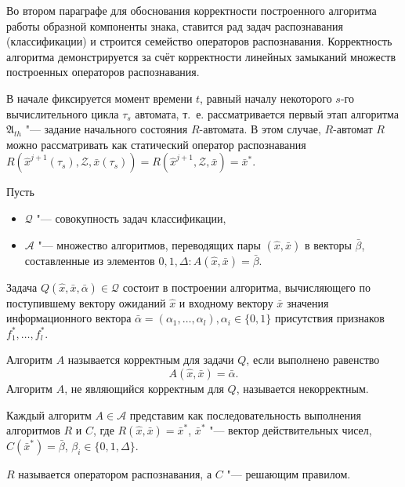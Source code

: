 Во втором параграфе для обоснования корректности построенного алгоритма работы образной компоненты знака, ставится рад задач распознавания (классификации) и строится семейство операторов распознавания. Корректность алгоритма демонстрируется за счёт корректности линейных замыканий множеств построенных операторов распознавания.

В начале фиксируется момент времени $t$, равный началу некоторого $s$-го вычислительного цикла $\tau_s$ автомата, т.~е. рассматривается первый этап алгоритма $\mathfrak A_{th}$ "--- задание начального состояния $R$-автомата.
В этом случае, $R$-автомат $R$ можно рассматривать как статический оператор распознавания $R(\hat x^{j+1}(\tau_s),\mathcal Z,\bar x(\tau_s))=R(\hat x^{j+1},\mathcal Z,\bar x)=\bar x^*$.

Пусть
\begin{itemize}
	\item $\mathcal Q$ "--- совокупность задач классификации,
	\item $\mathcal A$ "--- множество алгоритмов, переводящих пары $(\hat{x},\bar{x})$ в векторы $\bar{\beta}$, составленные из элементов $0,1,\Delta:A(\hat{x},\bar{x})=\bar{\beta}$.
\end{itemize}
Задача $Q(\hat{x},\bar{x},\bar\alpha)\in\mathcal Q$ состоит в построении алгоритма, вычисляющего по поступившему вектору ожиданий $\hat{x}$ и входному вектору $\bar{x}$ значения информационного вектора $\bar\alpha=(\alpha_1,\dots,\alpha_l), \alpha_i\in\{0,1\}$ присутствия признаков $f_1^*,…,f_l^*$.

\begin{Def}
	Алгоритм $A$ называется корректным для задачи $Q$, если выполнено равенство
	$$
	A(\hat{x},\bar{x})=\bar{\alpha}.
	$$
	Алгоритм $A$, не являющийся корректным для $Q$, называется некорректным.
\end{Def}

\begin{Pred}\label{st:decompositon}
	Каждый алгоритм $A\in\mathcal A$ представим как последовательность выполнения алгоритмов $R$ и $C$, где $R(\hat{x},\bar{x})=\bar{x}^*$, $\bar{x}^*$ "--- вектор действительных чисел, $C(\bar{x}^*)=\bar{\beta}$, $\beta_i\in\{0,1,\Delta\}$.
\end{Pred}
$R$ называется оператором распознавания, а $C$ "--- решающим правилом.

